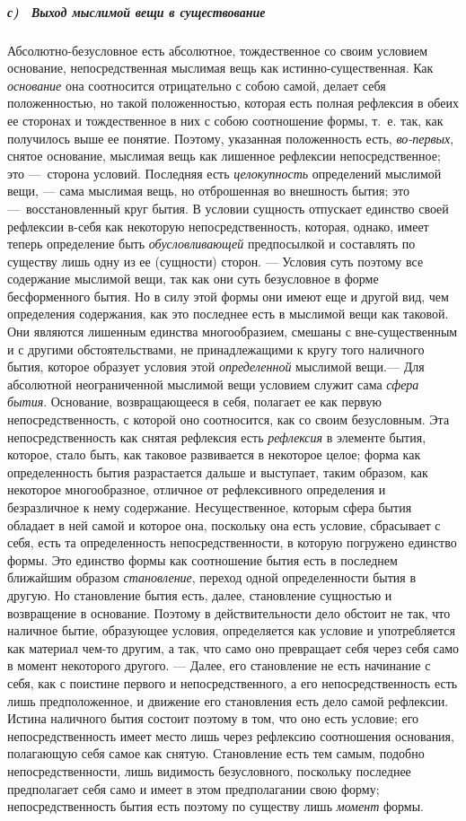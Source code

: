 \subparagraph[с) \ Выход мыслимой вещи в существование]{с) \ Выход мыслимой
вещи в существование}
Абсолютно-безусловное есть абсолютное,
тождественное со своим условием основание, непосредственная мыслимая вещь
как истинно-существенная. Как {\em основание} она
соотносится отрицательно с собою самой, делает себя положенностью, но такой
положенностью, которая есть полная рефлексия в обеих ее сторонах и
тождественное в них с собою соотношение формы, т.~е. так, как получилось
выше ее понятие. Поэтому, указанная положенность есть,
{\em во-первых}, снятое основание, мыслимая вещь как
лишенное рефлексии непосредственное; это —~сторона условий. Последняя есть
{\em целокупность} определений мыслимой вещи, — сама
мыслимая вещь, но отброшенная во внешность бытия; это —~восстановленный
круг бытия. В условии сущность отпускает единство своей рефлексии в-себя
как некоторую непосредственность, которая, однако, имеет теперь определение
быть {\em обусловливающей} предпосылкой и составлять по
существу лишь одну из ее (сущности) сторон. — Условия суть поэтому все
содержание мыслимой вещи, так как они суть безусловное в форме
бесформенного бытия. Но в силу этой формы они имеют еще и другой вид, чем
определения содержания, как это последнее есть в мыслимой вещи как таковой.
Они являются лишенным единства многообразием, смешаны с вне-существенным и
с другими обстоятельствами, не принадлежащими к кругу того наличного бытия,
которое образует условия этой {\em определенной}
мыслимой вещи.— Для абсолютной неограниченной мыслимой вещи условием служит
сама {\em сфера бытия}. Основание, возвращающееся в
себя, полагает ее как первую непосредственность, с которой оно соотносится,
как со своим безусловным. Эта непосредственность как снятая рефлексия есть
{\em рефлексия} в элементе бытия, которое, стало быть,
как таковое развивается в некоторое целое; форма как определенность бытия
разрастается дальше и выступает, таким образом, как некоторое
многообразное, отличное от рефлексивного определения и безразличное к нему
содержание. Несущественное, которым сфера бытия обладает в ней самой и
которое она, поскольку она есть условие, сбрасывает с себя, есть та
определенность непосредственности, в которую погружено единство формы. Это
единство формы как соотношение бытия есть в последнем ближайшим образом
{\em становление}, переход одной определенности бытия в
другую. Но становление бытия есть, далее, становление сущностью и
возвращение в основание. Поэтому в действительности дело обстоит не так,
что наличное бытие, образующее условия, определяется как условие и
употребляется как материал чем-то другим, а так, что само оно превращает
себя через себя само в момент некоторого другого. — Далее, его становление
не есть начинание с себя, как с поистине первого и непосредственного, а его
непосредственность есть лишь предположенное, и движение его становления
есть дело самой рефлексии. Истина наличного бытия состоит поэтому в том,
что оно есть условие; его непосредственность имеет место лишь через
рефлексию соотношения основания, полагающую себя самое как снятую.
Становление есть тем самым, подобно непосредственности, лишь видимость
безусловного, поскольку последнее предполагает себя само и имеет в этом
предполагании свою форму; непосредственность бытия есть поэтому по существу
лишь {\em момент} формы.

